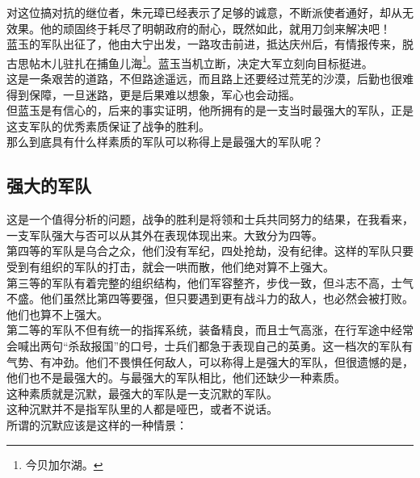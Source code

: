\begin{multicols}{\theparacolNo}
对这位搞对抗的继位者，朱元璋已经表示了足够的诚意，不断派使者通好，却从无效果。他的顽固终于耗尽了明朝政府的耐心，既然如此，就用刀剑来解决吧！\\

蓝玉的军队出征了，他由大宁出发，一路攻击前进，抵达庆州后，有情报传来，脱古思帖木儿驻扎在捕鱼儿海\footnote{今贝加尔湖。}。蓝玉当机立断，决定大军立刻向目标挺进。\\

这是一条艰苦的道路，不但路途遥远，而且路上还要经过荒芜的沙漠，后勤也很难得到保障，一旦迷路，更是后果难以想象，军心也会动摇。\\

但蓝玉是有信心的，后来的事实证明，他所拥有的是一支当时最强大的军队，正是这支军队的优秀素质保证了战争的胜利。\\

那么到底具有什么样素质的军队可以称得上是最强大的军队呢？\\

\subsection{强大的军队}
这是一个值得分析的问题，战争的胜利是将领和士兵共同努力的结果，在我看来，一支军队强大与否可以从其外在表现体现出来。大致分为四等。\\

第四等的军队是乌合之众，他们没有军纪，四处抢劫，没有纪律。这样的军队只要受到有组织的军队的打击，就会一哄而散，他们绝对算不上强大。\\

第三等的军队有着完整的组织结构，他们军容整齐，步伐一致，但斗志不高，士气不盛。他们虽然比第四等要强，但只要遇到更有战斗力的敌人，也必然会被打败。他们也算不上强大。\\

第二等的军队不但有统一的指挥系统，装备精良，而且士气高涨，在行军途中经常会喊出两句“杀敌报国”的口号，士兵们都急于表现自己的英勇。这一档次的军队有气势、有冲劲。他们不畏惧任何敌人，可以称得上是强大的军队，但很遗憾的是，他们也不是最强大的。与最强大的军队相比，他们还缺少一种素质。\\

这种素质就是沉默，最强大的军队是一支沉默的军队。\\

这种沉默并不是指军队里的人都是哑巴，或者不说话。\\

所谓的沉默应该是这样的一种情景：\\


\end{multicols}
